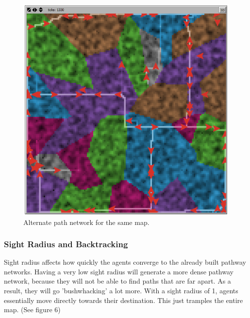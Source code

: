 \documentclass[conference]{IEEEtran}
\begin{document}
\begin{figure}[h]
\begin{center}
\includegraphics[scale=0.4]{image/results5}
\end{center}
\caption{Alternate path network for the same map.}
\end{figure}

\subsubsection{Sight Radius and Backtracking}
Sight radius affects how quickly the agents converge to the already built pathway networks. Having a very low sight radius will generate a more dense pathway network, because they will not be able to find paths that are far apart. As a result, they will go 'bushwhacking' a lot more. With a sight radius of 1, agents essentially move directly towards their destination. This just tramples the entire map. (See figure 6)
\end{document}
